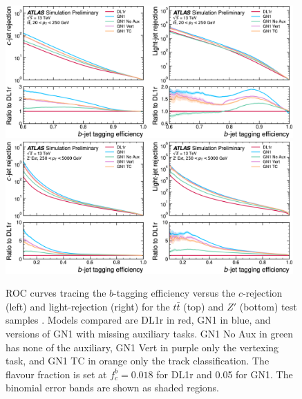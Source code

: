 \begin{figure}[h!]
  \centering
  \includegraphics[width=0.98\textwidth]{Images/FTAG/GN/GN1/ablations/ttb.png}
  \includegraphics[width=0.98\textwidth]{Images/FTAG/GN/GN1/ablations/zpb.png}
  \caption{ROC curves tracing the $b$-tagging efficiency versus the $c$-rejection (left) and light-rejection (right) for the $t\bar{t}$ (top) and $Z'$ (bottom) test samples \cite{ATL-PHYS-PUB-2022-027}. Models compared are DL1r in red, GN1 in blue, and versions of GN1 with missing auxiliary tasks. GN1 No Aux in green has none of the auxiliary, GN1 Vert in purple only the vertexing task, and GN1 TC in orange only the track classification. The flavour fraction is set at $f^b_c = 0.018$ for DL1r and 0.05 for GN1. The binomial error bands are shown as shaded regions.}
  \label{fig:GN1ablb}
\end{figure} 

